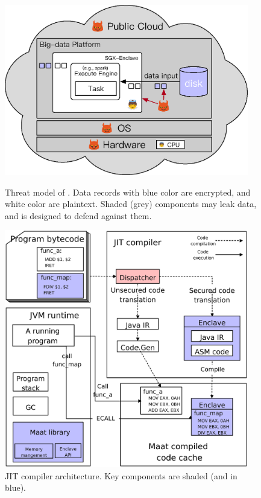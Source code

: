 \begin{figure}[h]
    \centering
    \begin{minipage}{.4\textwidth}    
          \vspace{-.1in}
        \includegraphics[width=0.95\textwidth]{figures/threat_public.ps}
        \caption{Threat model of \maat. Data records with blue color are 
encrypted, and white color are plaintext. Shaded (grey) components may leak 
data, and \maat is designed to defend against them.}
        \label{fig:maat-threat}
    \end{minipage}
    \hspace{.2in} 
    \centering
    \begin{minipage}{0.4\textwidth}
         \vspace{-.1in}
        \includegraphics[width=0.95\textwidth]{figures/jit_arch.ps}
         \vspace{-.1in}
        \caption{\maat JIT compiler architecture. Key components are 
shaded (and in blue).}
        \label{fig:maat-arch}
    \end{minipage}
\end{figure}

